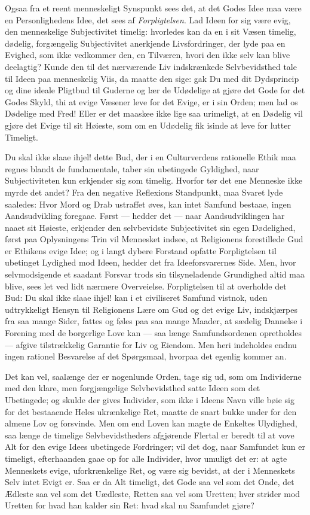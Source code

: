 \documentclass[12pt]{book}
\newcommand{\apage}[1]{\marginnote{\footnotesize\textit{[#1]}}}
\begin{document}
Ogsaa fra et reent menneskeligt Synspunkt sees det, at det Godes Idee maa være
en Personlighedens Idee, det sees af \emph{Forpligtelsen}. Lad Ideen for sig \apage{264} være
evig, den menneskelige Subjectivitet timelig: hvorledes kan da en i sit Væsen
timelig, dødelig, forgængelig Subjectivitet anerkjende Livsfordringer, der
lyde paa en Evighed, som ikke vedkommer den, en Tilværen, hvori den ikke selv
kan blive deelagtig? Kunde den til det nærværende Liv indskrænkede
Selvbevidsthed tale til Ideen paa menneskelig Viis, da maatte den sige: gak Du
med dit Dydsprincip og dine ideale Pligtbud til Guderne og lær de Udødelige at
gjøre det Gode for det Godes Skyld, thi at evige Væsener leve for det Evige,
er i sin Orden; men lad os Dødelige med Fred! Eller er det maaskee ikke lige
saa urimeligt, at en Dødelig vil gjøre det Evige til sit Høieste, som om en
Udødelig fik isinde at leve for lutter Timeligt.

Du skal ikke slaae ihjel! dette Bud, der i en Culturverdens rationelle Ethik
maa regnes blandt de fundamentale, taber sin ubetingede Gyldighed, naar
Subjectiviteten kun erkjender sig som timelig. Hvorfor tør det ene Menneske
ikke myrde det andet? Fra den negative Reflexions Standpunkt, maa Svaret lyde
saaledes: Hvor Mord og Drab ustraffet øves, kan intet Samfund bestaae, ingen
Aandsudvikling foregaae. Først --- hedder det --- naar Aandsudviklingen har
naaet sit Høieste, erkjender den selvbevidste Subjectivitet sin egen
Dødelighed, først paa Oplysningens Trin vil Mennesket indsee, at Religionens
forestillede Gud er Ethikens evige Idee; og i langt dybere Forstand opfatte
Forpligtelsen til ubetinget Lydighed mod Ideen, hedder det fra
Ideeforsvarernes Side. Men, hvor  \apage{265} selvmodsigende et saadant Forsvar trods sin
tilsyneladende Grundighed altid maa blive, sees let ved lidt nærmere
Overveielse. Forpligtelsen til at overholde det Bud: Du skal ikke slaae ihjel!
kan i et civiliseret Samfund vistnok, uden udtrykkeligt Hensyn til Religionens
Lære om Gud og det evige Liv, indskjærpes fra saa mange Sider, fattes og føles
paa saa mange Maader, at sædelig Dannelse i Forening med de borgerlige Love
kan --- saa længe Samfundsordenen opretholdes --- afgive tilstrækkelig
Garantie for Liv og Eiendom. Men heri indeholdes endnu ingen rationel
Besvarelse af det Spørgsmaal, hvorpaa det egenlig kommer an.

Det kan vel, saalænge der er nogenlunde Orden, tage sig ud, som om Individerne
med den klare, men forgjængelige Selvbevidsthed satte Ideen som det
Ubetingede; og skulde der gives Individer, som ikke i Ideens Navn ville bøie
sig for det bestaaende Heles ukrænkelige Ret, maatte de snart bukke under for
den almene Lov og forsvinde. Men om end Loven kan magte de Enkeltes Ulydighed,
saa længe de timelige Selvbevidstheders afgjørende Flertal er beredt til at
vove Alt for den evige Idees ubetingede Fordringer; vil det dog, naar
Samfundet kun er timeligt, efterhaanden gaae op for alle Individer, hvor
umuligt det er: at agte Menneskets evige, uforkrænkelige Ret, og være sig
bevidst, at der i Menneskets Selv intet Evigt er. Saa er da Alt timeligt, det
Gode saa vel som det Onde, det Ædleste saa vel som det Uædleste, Retten saa
vel som Uretten; hver strider mod  \apage{266} Uretten for hvad han kalder sin Ret: hvad
skal nu Samfundet gjøre?
\end{document}
